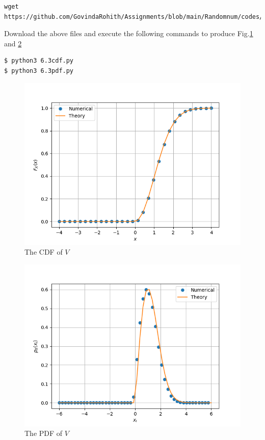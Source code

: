 \documentclass[journal,12pt,twocolumn]{IEEEtran}
\renewcommand\thesection{\arabic{section}}
\begin{document}
\begin{enumerate}[label=\thesection.\arabic*
,ref=\thesection.\theenumi]
\begin{enumerate}[label=\thesection.\arabic*
,ref=\thesection.\theenumi]
\begin{lstlisting}
wget https://github.com/GovindaRohith/Assignments/blob/main/Randomnum/codes/6.3pdf.py
\end{lstlisting}
Download the above files and execute the following commands to produce Fig.\ref{fig:6.3cdf} and \ref{fig:6.3pdf}
\begin{lstlisting}
$ python3 6.3cdf.py
$ python3 6.3pdf.py
\end{lstlisting}
\begin{figure}[!h]
\centering
\includegraphics[width=\columnwidth]{./figs/6.3cdf.png}
\caption{The CDF of $V$}
\label{fig:6.3cdf}
\end{figure}
\begin{figure}[!h]
\centering
\includegraphics[width=\columnwidth]{./figs/6.3pdf.png}
\caption{The PDF of $V$}
\label{fig:6.3pdf}
\end{figure}
\end{enumerate}
\end{enumerate}
\end{document}
